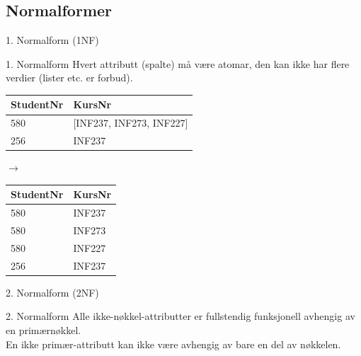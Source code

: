 \subsection*{Normalformer}
\begin{frame}{1. Normalform (1NF)}
    \begin{block}{1. Normalform}
    Hvert attributt (spalte) må være atomar, den kan ikke har flere verdier (lister etc. er forbud).
    \end{block}
    \vfill
    \begin{tabular}{l|l}
     StudentNr & KursNr\\\hline
     580 & [INF237, INF273, INF227]\\
     256 & INF237\\
     \end{tabular}
     \hfill
     $\rightarrow$
     \hfill
     \begin{tabular}{l|l}
     StudentNr & KursNr\\\hline
     580 & INF237\\
     580 & INF273\\
     580 & INF227\\
     256 & INF237\\
    \end{tabular}
\end{frame}

\begin{frame}{2. Normalform (2NF)}
    \begin{block}{2. Normalform}
    Alle ikke-nøkkel-attributter er fullstendig funksjonell avhengig av en primærnøkkel.\\
    En ikke primær-attributt kan ikke være avhengig av bare en del av nøkkelen.
    \end{block}
    \vfill
\end{frame}

